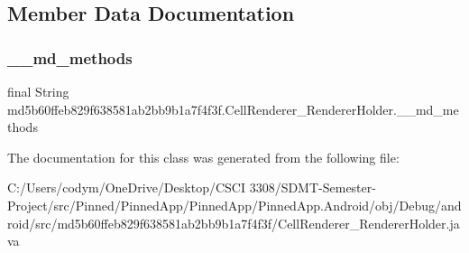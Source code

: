 \subsection{Member Data Documentation}
\mbox{\label{classmd5b60ffeb829f638581ab2bb9b1a7f4f3f_1_1_cell_renderer___renderer_holder_a4578cafbc2b812d71e4d477b6ee135b3}} 
\subsubsection{\texorpdfstring{\+\_\+\+\_\+md\+\_\+methods}{\_\_md\_methods}}
{\footnotesize\ttfamily final String md5b60ffeb829f638581ab2bb9b1a7f4f3f.\+Cell\+Renderer\+\_\+\+Renderer\+Holder.\+\_\+\+\_\+md\+\_\+methods\hspace{0.3cm}{\ttfamily [static]}}



The documentation for this class was generated from the following file\+:\begin{DoxyCompactItemize}
\item 
C\+:/\+Users/codym/\+One\+Drive/\+Desktop/\+C\+S\+C\+I 3308/\+S\+D\+M\+T-\/\+Semester-\/\+Project/src/\+Pinned/\+Pinned\+App/\+Pinned\+App/\+Pinned\+App.\+Android/obj/\+Debug/android/src/md5b60ffeb829f638581ab2bb9b1a7f4f3f/Cell\+Renderer\+\_\+\+Renderer\+Holder.\+java\end{DoxyCompactItemize}
